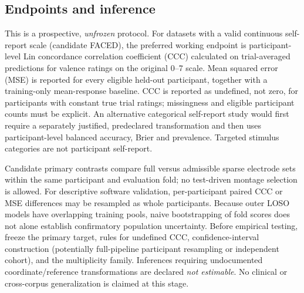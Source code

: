 \subsection{Endpoints and inference}
This is a prospective, \emph{unfrozen} protocol. For datasets with a valid continuous self-report scale (candidate FACED), the preferred working endpoint is participant-level Lin concordance correlation coefficient (CCC) calculated on trial-averaged predictions for valence ratings on the original 0--7 scale. Mean squared error (MSE) is reported for every eligible held-out participant, together with a training-only mean-response baseline. CCC is reported as undefined, not zero, for participants with constant true trial ratings; missingness and eligible participant counts must be explicit. An alternative categorical self-report study would first require a separately justified, predeclared transformation and then uses participant-level balanced accuracy, Brier and prevalence. Targeted stimulus categories are not participant self-report.

Candidate primary contrasts compare full versus admissible sparse electrode sets within the same participant and evaluation fold; no test-driven montage selection is allowed. For descriptive software validation, per-participant paired CCC or MSE differences may be resampled as whole participants. Because outer LOSO models have overlapping training pools, naive bootstrapping of fold scores does not alone establish confirmatory population uncertainty. Before empirical testing, freeze the primary target, rules for undefined CCC, confidence-interval construction (potentially full-pipeline participant resampling or independent cohort), and the multiplicity family. Inferences requiring undocumented coordinate/reference transformations are declared \emph{not estimable}. No clinical or cross-corpus generalization is claimed at this stage.

